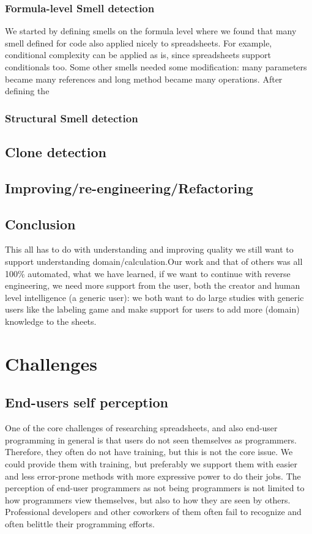 \documentclass[conference]{IEEEtran}
\begin{document}
\subsubsection{Formula-level Smell detection}
We started by defining smells on the formula level where we found that many smell defined for code also applied nicely to spreadsheets. For example, conditional complexity can be applied as is, since spreadsheets support conditionals too. Some other smells needed some modification: many parameters became many references and long method became many operations. After defining the 

\subsubsection{Structural Smell detection}

\subsection{Clone detection}

\subsection{Improving/re-engineering/Refactoring}


\subsection{Conclusion}
This all has to do with understanding and improving quality we still want to support understanding domain/calculation.Our work and that of others was all 100\% automated, what we have learned, if we want to continue with reverse engineering, we need more support from the user, both the creator and human level intelligence (a generic user): we both want to do large studies with generic users like the labeling game and make support for users to add more (domain) knowledge to the sheets.

\section{Challenges} 

\subsection{End-users self perception}
One of the core challenges of researching spreadsheets, and also end-user programming in general is that users do not seen themselves as programmers. Therefore, they often do not have training, but this is not the core issue. We could provide them with training, but preferably we support them with easier and less error-prone methods with more expressive power to do their jobs.
The perception of end-user programmers as not being programmers is not limited to how programmers view themselves, but also to how they are seen by others. Professional developers and other coworkers of them often fail to recognize and often belittle their programming efforts.
\end{document}
